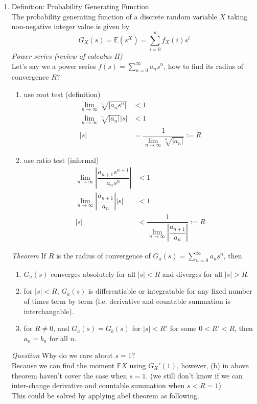 \documentclass[11pt]{article}
\begin{document}
\begin{enumerate}
\item Definition: Probability Generating Function\\
The probability generating function of a discrete random variable $X$ taking non-negative integer value is given by
$$G_{X}(s) = \mathbb{E}(s^{X})= \sum_{i=0}^{\infty}f_{X}(i) s^{i}$$
\textit{Power series (review of calculus II)}\\
Let's say we a power series $f(s) = \sum_{n=0}^{\infty}a_n s^n$, how to find its radius of convergence $R$?
\begin{enumerate}
\item use root test (definition)
\begin{align*}
\lim_{n \to \infty} \sqrt[n]{|a_n s^{n}|} &<1\\
\lim_{n \to \infty} \sqrt[n]{|a_n|}|s| &<1\\
|s| &= \dfrac{1}{\lim_{n \to \infty} \sqrt[n]{|a_n|}} := R
\end{align*}
\item use ratio test (informal)
\begin{align*}
\lim_{n \to \infty} |\dfrac{a_{n+1}s^{n+1}}{a_{n}s^{n}}| &<1\\
\lim_{n \to \infty} |\dfrac{a_{n+1}}{a_{n}}||s| &<1\\
|s| &< \dfrac{1}{\lim_{n \to \infty} |\dfrac{a_{n+1}}{a_{n}}|} := R
\end{align*}
\end{enumerate}
\textit{Theorem}
If $R$ is the radius of convergence of $G_{a}(s) = \sum_{n=0}^{\infty}a_n s^{n}$, then
\begin{enumerate}
\item $G_a(s)$ converges absolutely  for all $|s|<R$ and diverges for all $|s|>R$.
\item for $|s|<R$, $G_a(s)$ is differentiable or integratable for any fixed number of times term by term (i.e. derivative and countable summation is interchangable).
\item for $R \neq 0$, and $G_a(s) = G_b(s)$ for $|s|< R'$ for some $0<R'<R$, then $a_n = b_n$ for all $n$.
\end{enumerate}
\textit{Question} Why do we care about $s = 1$?\\
Because we can find the moment $\mathbb{E}X$ using $G_{X}'(1)$, however, (b) in above theorem haven't cover the case when $s =1$. (we still don't know if we can inter-change derivative and countable summation when $s<R =1$)\\
This could be solved by applying abel theorem as following.


\end{enumerate}
\end{document}
